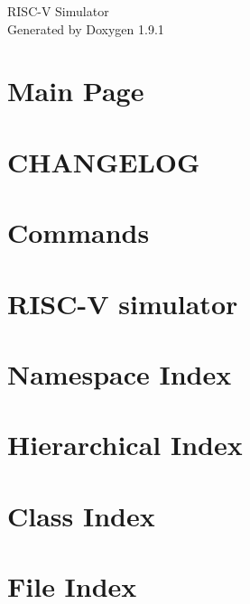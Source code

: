 \let\mypdfximage\pdfximage\def\pdfximage{\immediate\mypdfximage}\documentclass[twoside]{book}
\newcommand{\+}{\discretionary{\mbox{\scriptsize$\hookleftarrow$}}{}{}}
\newcommand{\clearemptydoublepage}{%
  \newpage{\pagestyle{empty}\cleardoublepage}%
}
\begin{document}
\raggedbottom

\hypersetup{pageanchor=false,
             bookmarksnumbered=true,
             pdfencoding=unicode
            }
\begin{titlepage}
\vspace*{7cm}
\begin{center}%
{\Large RISC-\/V Simulator }\\
\vspace*{1cm}
{\large Generated by Doxygen 1.9.1}\\
\end{center}
\end{titlepage}
\clearemptydoublepage
{}
\tableofcontents
\clearemptydoublepage
{}
\hypersetup{pageanchor=true}

\chapter{Main Page}
\label{index}\hypertarget{index}{}
\chapter{CHANGELOG}
\label{md_CHANGELOG}

\chapter{Commands}
\label{md_COMMANDS}

\chapter{RISC-\/V simulator}
\label{md_README}

\chapter{Namespace Index}

\chapter{Hierarchical Index}

\chapter{Class Index}

\chapter{File Index}

\end{document}
